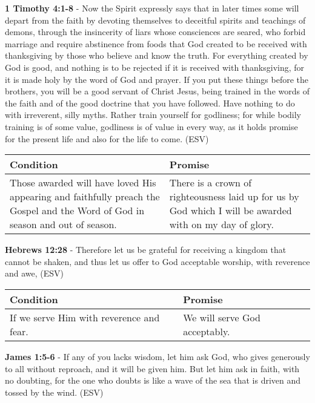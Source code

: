 \documentclass[11pt]{article}
\begin{document}
\textbf{1 Timothy 4:1-8} -  Now the Spirit expressly says that in later times some will depart from the faith by devoting themselves to deceitful spirits and teachings of demons, through the insincerity of liars whose consciences are seared, who forbid marriage and require abstinence from foods that God created to be received with thanksgiving by those who believe and know the truth.  For everything created by God is good, and nothing is to be rejected if it is received with thanksgiving, for it is made holy by the word of God and prayer.  If you put these things before the brothers, you will be a good servant of Christ Jesus, being trained in the words of the faith and of the good doctrine that you have followed.  Have nothing to do with irreverent, silly myths.  Rather train yourself for godliness; for while bodily training is of some value, godliness is of value in every way, as it holds promise for the present life and also for the life to come.  (ESV)

\begin{center}
\begin{tabular}{ll}
Condition & Promise\\[0pt]
\hline
Those awarded will have loved His appearing and faithfully preach the Gospel and the Word of God in season and out of season. & There is a crown of righteousness laid up for us by God which I will be awarded with on my day of glory.\\[0pt]
\end{tabular}
\end{center}

\textbf{Hebrews 12:28} -  Therefore let us be grateful for receiving a kingdom that cannot be shaken, and thus let us offer to God acceptable worship, with reverence and awe,  (ESV)

\begin{center}
\begin{tabular}{ll}
Condition & Promise\\[0pt]
\hline
If we serve Him with reverence and fear. & We will serve God acceptably.\\[0pt]
\end{tabular}
\end{center}

\textbf{James 1:5-6} -  If any of you lacks wisdom, let him ask God, who gives generously to all without reproach, and it will be given him.  But let him ask in faith, with no doubting, for the one who doubts is like a wave of the sea that is driven and tossed by the wind.  (ESV)
\end{document}
